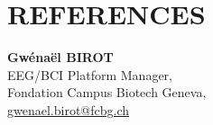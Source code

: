 \documentclass[]{cv-style}
\begin{document}
\section{REFERENCES}
\textbf{Gwénaël BIROT} \\
    EEG/BCI Platform Manager, \\
    Fondation Campus Biotech Geneva,\\
\url{gwenael.birot@fcbg.ch}
%
\end{document}

